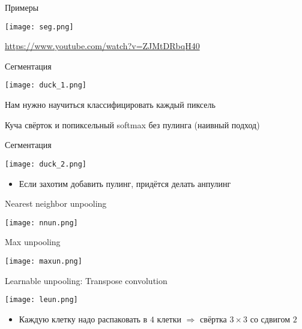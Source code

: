 \documentclass[notes,12pt, aspectratio=169]{beamer}
\newenvironment{wideitemize}{\itemize\addtolength{\itemsep}{10pt}}{\enditemize}
\begin{document}
\begin{frame}{Примеры}
\begin{center}
	\texttt{[image: seg.png]}
\end{center}

\vfill
\footnotesize
{\color{blue} \url{https://www.youtube.com/watch?v=ZJMtDRbqH40}}
\end{frame}


\begin{frame}{Сегментация}
\begin{center}
\texttt{[image: duck\_1.png]}
\end{center}
\begin{wideitemize}
\item Нам нужно научиться классифицировать каждый пиксель
\item Куча свёрток и попиксельный softmax без пулинга (наивный подход)
\end{wideitemize}
\end{frame}


\begin{frame}{Сегментация}
\begin{center}
\texttt{[image: duck\_2.png]}
\end{center}
\begin{itemize}
\item Если захотим добавить пулинг, придётся делать анпулинг
\end{itemize}
\end{frame}


\begin{frame}{Nearest neighbor unpooling}
\begin{center}
\texttt{[image: nnun.png]}
\end{center}
\end{frame}


\begin{frame}{Max unpooling}
\begin{center}
\texttt{[image: maxun.png]}
\end{center}
\end{frame}


\begin{frame}{Learnable unpooling: Transpose convolution}
\begin{center}
\texttt{[image: leun.png]}
\end{center}
\begin{itemize}
	\item Каждую клетку надо распаковать в $4$ клетки $\Rightarrow$ свёртка $3 \times 3$ со сдвигом $2$
\end{itemize}
\end{frame}
\end{document}
